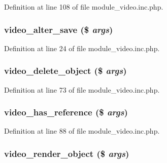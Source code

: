 Definition at line 108 of file module\_\-video.inc.php.

\hypertarget{module__video_8inc_8php_a0e3433d55c8d20b28c95a757740982e1}{
\subsubsection[{video\_\-alter\_\-save}]{\setlength{\rightskip}{0pt plus 5cm}video\_\-alter\_\-save (\$ {\em args})}}
\label{module__video_8inc_8php_a0e3433d55c8d20b28c95a757740982e1}


Definition at line 24 of file module\_\-video.inc.php.

\hypertarget{module__video_8inc_8php_a4d25a132251840ed2ade27b636a6694e}{
\subsubsection[{video\_\-delete\_\-object}]{\setlength{\rightskip}{0pt plus 5cm}video\_\-delete\_\-object (\$ {\em args})}}
\label{module__video_8inc_8php_a4d25a132251840ed2ade27b636a6694e}


Definition at line 73 of file module\_\-video.inc.php.

\hypertarget{module__video_8inc_8php_adbbede5e492ca7b9457deaf076c887b0}{
\subsubsection[{video\_\-has\_\-reference}]{\setlength{\rightskip}{0pt plus 5cm}video\_\-has\_\-reference (\$ {\em args})}}
\label{module__video_8inc_8php_adbbede5e492ca7b9457deaf076c887b0}


Definition at line 88 of file module\_\-video.inc.php.

\hypertarget{module__video_8inc_8php_a14d6bc200a41905ad201a24d9a2d9be5}{
\subsubsection[{video\_\-render\_\-object}]{\setlength{\rightskip}{0pt plus 5cm}video\_\-render\_\-object (\$ {\em args})}}
\label{module__video_8inc_8php_a14d6bc200a41905ad201a24d9a2d9be5}


